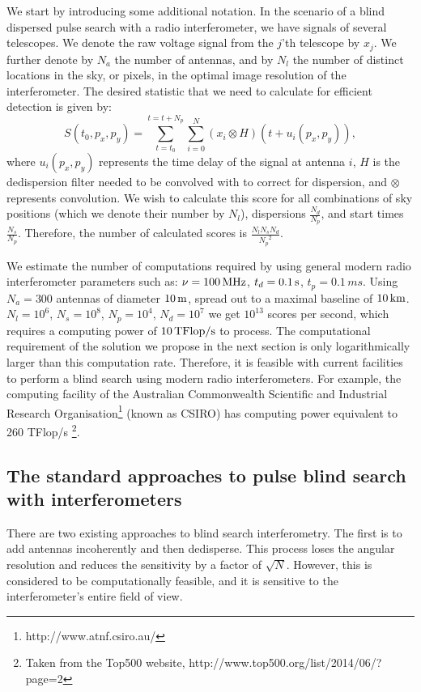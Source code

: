 \documentclass[iop]{emulateapj}
\begin{document}
We start by introducing some additional notation.
In the scenario of a blind dispersed pulse search with a radio interferometer, we have signals of several telescopes.
We denote the raw voltage signal from the $j$'th telescope by $x_j$.
We further denote by $N_{a}$ the number of antennas, and by $N_{l}$ the number of distinct locations in the sky, or pixels, in the optimal image resolution of the interferometer.
The desired statistic that we need to calculate for efficient detection is given by:
\begin{equation}
S(t_0,p_x,p_y) = \sum_{t = t_0}^{t = t + {N_{p}}}{\sum_{i=0}^{N}{(x_i\otimes H)(t + u_i(p_x,p_y))}}, 
\end{equation}
where $u_i(p_x,p_y)$ represents the time delay of the signal at antenna $i$, $H$ is the dedispersion filter needed to be convolved with to correct for dispersion, and $\otimes$ represents convolution.
We wish to calculate this score for all combinations of sky positions (which we denote their number by $N_l$), dispersions $\frac{{N_{d}}}{{N_{p}}}$, and start times $\frac{{N_{s}}}{{N_{p}}}$. Therefore, the number of calculated scores is $\frac{N_{l}{N_{s}}{N_{d}}}{{N_{p}}^2}$.

We estimate the number of computations required by using general modern radio interferometer parameters such as:
$\nu = 100\,{\rm MHz}$, $t_d = 0.1\,{\rm s}$, $t_p = 0.1\,{ms}$. Using $N_a = 300$ antennas of diameter $10\,{\rm m}$, spread out to a maximal baseline of $10\,{\rm km}$.
$N_{l}=10^6$, $N_{s} = 10^8$, ${N_{p}}=10^4$, ${N_{d}} = 10^7$ we get $10^{13}$ scores per second, which requires a computing power of $10\,{\rm TFlop/s}$ to process.
The computational requirement of the solution we propose in the next section is only logarithmically larger than this computation rate.
Therefore, it is feasible with current facilities to perform a blind search using modern radio interferometers. 
For example, the computing facility of the Australian Commonwealth Scientific and Industrial Research Organisation\footnote{http://www.atnf.csiro.au/} (known as CSIRO) has computing power equivalent to 260 TFlop/s \footnote{Taken from the Top500 website, http://www.top500.org/list/2014/06/?page=2}.

\subsection{The standard approaches to pulse blind search with interferometers}
There are two existing approaches to blind search interferometry.
The first is to add antennas incoherently and then dedisperse.
This process loses the angular resolution and reduces the sensitivity by a factor of $\sqrt{N}$. However, this is considered to be computationally feasible, and it is sensitive to the interferometer's entire field of view.
\end{document}
